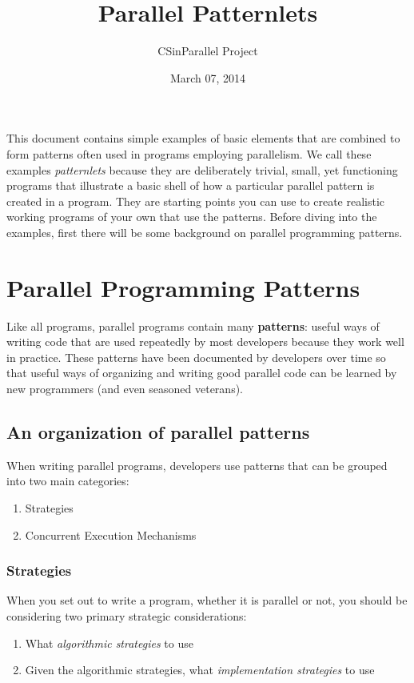 \documentclass[letterpaper,10pt,openany,oneside]{sphinxmanual}
\title{Parallel Patternlets}
\date{March 07, 2014}
\author{CSinParallel Project}
\begin{document}
\maketitle
\tableofcontents
{}\label{index::doc}


This document contains simple examples of basic elements that are combined to form patterns often used in programs employing parallelism.  We call these examples \emph{patternlets} because they are deliberately trivial, small, yet functioning programs that illustrate a basic shell of how a particular parallel pattern is created in a program.  They are starting points you can use to create realistic working programs of your own that use the patterns.  Before diving into the examples, first there will be some background on parallel programming patterns.


\chapter{Parallel Programming Patterns}
\label{PatternsIntro:parallel-programming-patterns}\label{PatternsIntro::doc}\label{PatternsIntro:parallel-patternlets}
Like all programs, parallel programs contain many \textbf{patterns}: useful ways of writing code that are used repeatedly by most developers because they work well in practice.  These patterns have been documented by developers over time so that useful ways of organizing and writing good parallel code can be learned by new programmers (and even seasoned veterans).


\section{An organization of parallel patterns}
\label{PatternsIntro:an-organization-of-parallel-patterns}
When writing parallel programs, developers use patterns that can be grouped into two main categories:
\begin{enumerate}
\item {} 
Strategies

\item {} 
Concurrent Execution Mechanisms

\end{enumerate}


\subsection{Strategies}
\label{PatternsIntro:strategies}
When you set out to write a program, whether it is parallel or not, you should be considering two primary strategic considerations:
\begin{enumerate}
\item {} 
What \emph{algorithmic strategies} to use

\item {} 
Given the algorithmic strategies, what \emph{implementation strategies} to use

\end{enumerate}
\end{document}
